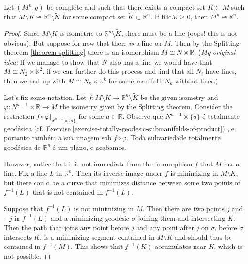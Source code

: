 \begin{exercise}
\label{exercise-complete-without-a-compact-set-isometric-to-Rn}
Let $(M^n,g)$ be complete and such that there exists a compact set
 $K\subset M$ such that $M\setminus K \cong \mathbb{R}^n \setminus \tilde{K}$
for some compact set $\tilde{K} \subset \mathbb{R}^n$. If $\text{Ric}M \geq 0$,
then $M^n \cong \mathbb{R}^n$.
\end{exercise}

\begin{proof}
Since $M\setminus K$ is isometric to $\mathbb{R}^n\setminus \tilde{K}$, there
must be a line (oops! this is not obvious). But suppose for now that there {\it
is} a line on $M$. Then by the Splitting theorem \ref{theorem-splitting} there 
is an isomorphism $M \cong N \times \mathbb{R}$. ({\it My original idea:}
 If we manage to show that $N$ also has a line we would have that
 $M \cong N_2 \times \mathbb{R}^2$.  if we can further do this process and find
 that all $N_i$ have lines,
then we end up with $M \cong N_k \times \mathbb{R}^k$ for some manifold $N_k$
without lines.)

Let's fix some notation. Let 
$f:M\setminus K \to \mathbb{R}^n \setminus\tilde{K}$ be the given isometry and
$\varphi:N^{n-1}\times\mathbb{R} \to M$ the isometry given by the Splitting
theorem. Consider the restriction $f \circ \varphi |_{ N^{n-1}\times \{ a\}}$
for some $a \in \mathbb{R}$. Observe que $N^{n-1}\times \{ a\}$ é totalmente
geodésica (cf. Exercise \ref{exercise-totally-geodesic-submanifolds-of-product})
, e portanto também a sua imagem sob  $f \circ \varphi$. Toda subvariedade
totalmente geodésica de $\mathbb{R}^n$ é um plano, e acabamos.

However, notice that it is not immediate from the
isomorphism $f$ that $M$ has a line. Fix a line $L$ in $\mathbb{R}^n$. Then its
inverse image under $f$ is minimizing in $M \setminus K$, but there could be a
curve that minimizes distance between some two points of $f^{-1}(L)$ that is not
contained in $f^{-1}(L)$.

Suppose that $f^{-1}(L)$ is not minimizing in $M$. Then there are two points $j$
and $-j$ in $f^{-1}(L)$ and a minimizing geodesic $\sigma$ joining them and
intersecting $K$. Then the path that joins any point before $j$ and any point
after $j$ on $\sigma$, before $\sigma$ intersects $K$, is a minimizing segment
contained in $M\setminus K$ and should thus be contained in $f^{-1}(M)$. This
shows that $f^{-1}(K)$ accumulates near $K$, which is not possible.
\end{proof}

